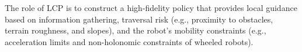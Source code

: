 \documentclass[letterpaper]{article} %
\newcommand{\phdone}[1]{} %
\begin{document}



%
%
% 
The role of LCP is to construct a high-fidelity policy that provides local guidance based on information gathering, traversal risk (e.g., proximity to obstacles, terrain roughness, and slopes), and the robot's mobility constraints (e.g., acceleration limits and non-holonomic constraints of wheeled robots).
\end{document}
